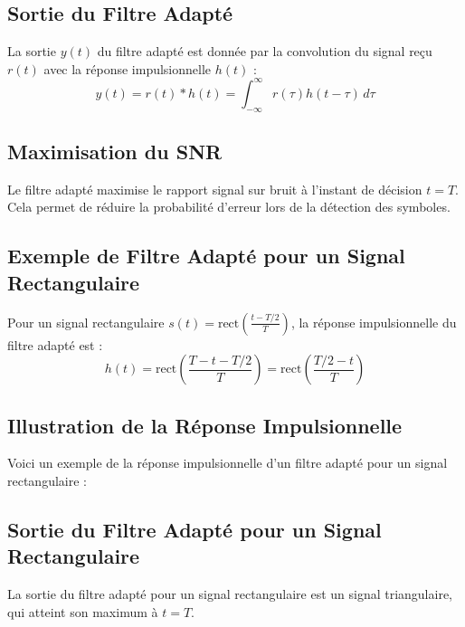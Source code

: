 \documentclass[10pt,a4paper]{article}
\begin{document}
\subsection*{Sortie du Filtre Adapté}
La sortie \( y(t) \) du filtre adapté est donnée par la convolution du signal reçu \( r(t) \) avec la réponse impulsionnelle \( h(t) \) :
\[ y(t) = r(t) * h(t) = \int_{-\infty}^{\infty} r(\tau) h(t - \tau) \, d\tau \]

\subsection*{Maximisation du SNR}
Le filtre adapté maximise le rapport signal sur bruit à l'instant de décision \( t = T \). Cela permet de réduire la probabilité d'erreur lors de la détection des symboles.

\subsection*{Exemple de Filtre Adapté pour un Signal Rectangulaire}
Pour un signal rectangulaire \( s(t) = \text{rect}\left(\frac{t - T/2}{T}\right) \), la réponse impulsionnelle du filtre adapté est :
\[ h(t) = \text{rect}\left(\frac{T - t - T/2}{T}\right) = \text{rect}\left(\frac{T/2 - t}{T}\right) \]

\subsection*{Illustration de la Réponse Impulsionnelle}
Voici un exemple de la réponse impulsionnelle d'un filtre adapté pour un signal rectangulaire :


\subsection*{Sortie du Filtre Adapté pour un Signal Rectangulaire}
La sortie du filtre adapté pour un signal rectangulaire est un signal triangulaire, qui atteint son maximum à \( t = T \).
\end{document}
